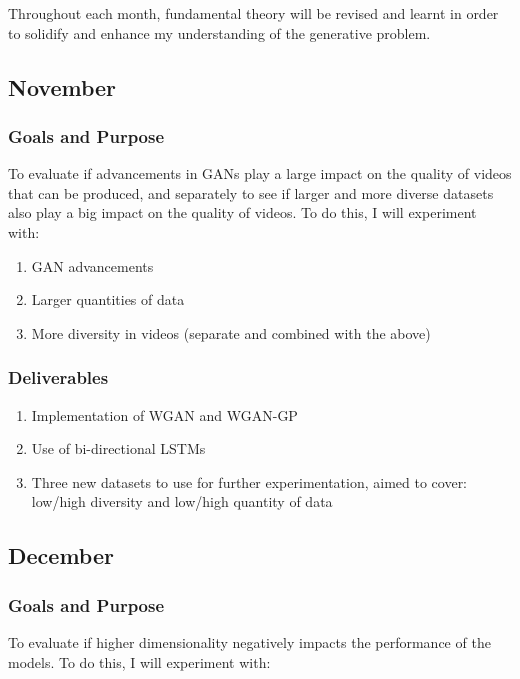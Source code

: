 \documentclass{article}
\begin{document}
{{Throughout each month, fundamental theory will be revised and learnt in order to
solidify and enhance my understanding of the generative problem.

\subsection{November}

\subsubsection{Goals and Purpose}

To evaluate if advancements in GANs play a large impact on the quality of videos that can be produced, and separately to see if larger and more diverse datasets also play a big impact on the quality of videos. To do this, I will experiment with:

\begin{enumerate}
    \item GAN advancements
    \item Larger quantities of data
    \item More diversity in videos (separate and combined with the above)
\end{enumerate}

\subsubsection{Deliverables}

\begin{enumerate}
    \item Implementation of WGAN and WGAN-GP
    \item Use of bi-directional LSTMs
    \item Three new datasets to use for further experimentation, aimed to cover: low/high diversity and low/high quantity of data
\end{enumerate}

\subsection{December}

\subsubsection{Goals and Purpose}

To evaluate if higher dimensionality negatively impacts the performance of the models. To do this, I will experiment with:

}}
\end{document}
